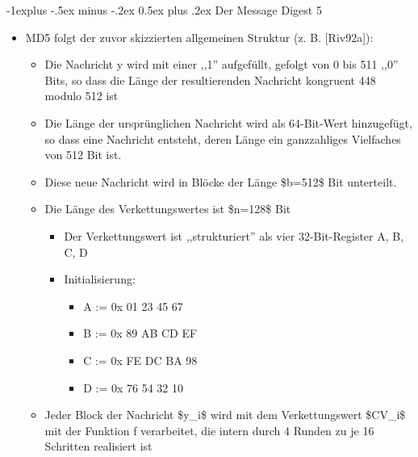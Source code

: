\documentclass[a4paper]{article}
\makeatletter
\renewcommand{\subsection}{\@startsection{subsection}{2}{0mm}%
 {-1explus -.5ex minus -.2ex}%
 {0.5ex plus .2ex}%
 {\normalfont\normalsize\bfseries}}
\makeatother
\begin{document}
\begin{multicols}{3}
    \subsection{Der Message Digest 5}

    \begin{itemize}
        \item
              MD5 folgt der zuvor skizzierten allgemeinen Struktur (z. B.
              {[}Riv92a{]}):

              \begin{itemize}
                  \item
                        Die Nachricht y wird mit einer ,,1'' aufgefüllt, gefolgt von 0 bis
                        511 ,,0'' Bits, so dass die Länge der resultierenden Nachricht
                        kongruent 448 modulo 512 ist
                  \item
                        Die Länge der ursprünglichen Nachricht wird als 64-Bit-Wert
                        hinzugefügt, so dass eine Nachricht entsteht, deren Länge ein
                        ganzzahliges Vielfaches von 512 Bit ist.
                  \item
                        Diese neue Nachricht wird in Blöcke der Länge \$b=512\$ Bit
                        unterteilt.
                  \item
                        Die Länge des Verkettungswertes ist \$n=128\$ Bit

                        \begin{itemize}
                            \item
                                  Der Verkettungswert ist ,,strukturiert'' als vier 32-Bit-Register
                                  A, B, C, D
                            \item
                                  Initialisierung:

                                  \begin{itemize}
                                      \item
                                            A := 0x 01 23 45 67
                                      \item
                                            B := 0x 89 AB CD EF
                                      \item
                                            C := 0x FE DC BA 98
                                      \item
                                            D := 0x 76 54 32 10
                                  \end{itemize}
                        \end{itemize}
                  \item
                        Jeder Block der Nachricht \$y\_i\$ wird mit dem Verkettungswert
                        \$CV\_i\$ mit der Funktion f verarbeitet, die intern durch 4 Runden
                        zu je 16 Schritten realisiert ist


\end{itemize}
\end{itemize}
\end{multicols}
\end{document}
